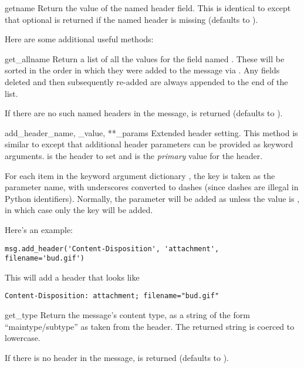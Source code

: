\begin{methoddesc}[Message]{get}{name}
Return the value of the named header field.  This is identical to
 except that optional  is returned
if the named header is missing (defaults to ).
\end{methoddesc}

Here are some additional useful methods:

\begin{methoddesc}[Message]{get_all}{name}
Return a list of all the values for the field named .  These
will be sorted in the order in which they were added to the message
via .  Any fields
deleted and then subsequently re-added are always appended to the end
of the list.

If there are no such named headers in the message,  is
returned (defaults to ).
\end{methoddesc}

\begin{methoddesc}[Message]{add_header}{_name, _value, **_params}
Extended header setting.  This method is similar to
 except that additional header parameters can be
provided as keyword arguments.   is the header to set and
 is the \emph{primary} value for the header.

For each item in the keyword argument dictionary , the
key is taken as the parameter name, with underscores converted to
dashes (since dashes are illegal in Python identifiers).  Normally,
the parameter will be added as  unless the value is
, in which case only the key will be added.

Here's an example:

\begin{verbatim}
msg.add_header('Content-Disposition', 'attachment', filename='bud.gif')
\end{verbatim}

This will add a header that looks like

\begin{verbatim}
Content-Disposition: attachment; filename="bud.gif"
\end{verbatim}
\end{methoddesc}

\begin{methoddesc}[Message]{get_type}{}
Return the message's content type, as a string of the form
``maintype/subtype'' as taken from the  header.
The returned string is coerced to lowercase.

If there is no  header in the message,
 is returned (defaults to ).
\end{methoddesc}

